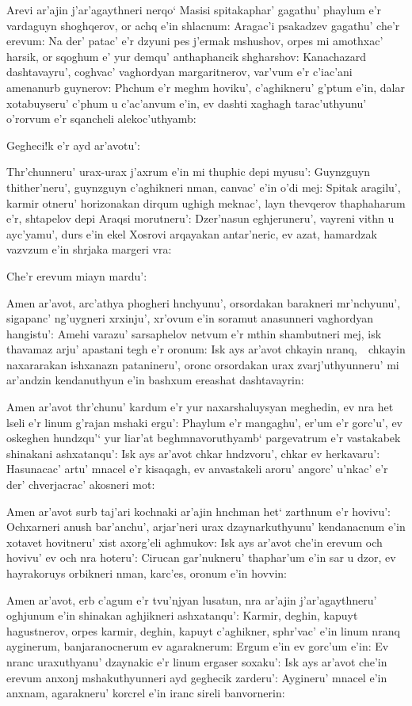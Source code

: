Arevi ar'ajin j'ar'agaythneri nerqo` Masisi spitakaphar' gagathu' phaylum e'r
vardaguyn shoghqerov, or achq e'in shlacnum: Aragac'i psakadzev gagathu' che'r
erevum: Na der' patac' e'r dzyuni pes j'ermak mshushov, orpes mi amothxac'
harsik, or sqoghum e' yur demqu' anthaphancik shgharshov: Kanachazard
dashtavayru', coghvac' vaghordyan margaritnerov, var'vum e'r c'iac'ani
amenanurb guynerov: Phchum e'r meghm hoviku', c'aghikneru' g'ptum e'in, dalar
xotabuyseru' c'phum u c'ac'anvum e'in, ev dashti xaghagh tarac'uthyunu'
o'rorvum e'r sqancheli alekoc'uthyamb:

Gegheci!k e'r ayd ar'avotu':

Thr'chunneru' urax-urax j'axrum e'in mi thuphic depi myusu': Guynzguyn
thi\-ther'\-neru', guynzguyn c'aghikneri nman, canvac' e'in o'di mej: Spitak
aragilu', karmir otneru' horizonakan dirqum ughigh meknac', layn thevqerov
thaphaharum e'r, shtapelov depi Araqsi morutneru': Dzer'nasun eghjeruneru',
vayreni vithn u ayc'yamu', durs e'in ekel Xosrovi arqayakan antar'neric, ev
azat, hamardzak vazvzum e'in shrjaka margeri vra:

Che'r erevum miayn mardu':

Amen ar'avot, arc'athya phogheri hnchyunu', orsordakan barakneri mr'nchyunu',
si\-ga\-panc' ng'uygneri xrxinju', xr'ovum e'in soramut anasunneri vaghordyan
hangistu': Amehi varazu' sarsaphelov netvum e'r mthin shambutneri mej, isk
thavamaz arju' apastani tegh e'r oronum: Isk ays ar'avot chkayin
nranq,~\armemdash~chkayin naxararakan ishxanazn patanineru', oronc orsordakan
urax zvarj'uthyunneru' mi ar'andzin ken\-da\-nu\-thyun e'in bashxum ereashat
dashtavayrin:

Amen ar'avot thr'chunu' kardum e'r yur naxarshaluysyan meghedin, ev nra het
lseli e'r linum g'rajan mshaki ergu': Phaylum e'r mangaghu', er'um e'r
gorc'u', ev oskeghen hundzqu'` yur liar'at beghmnavoruthyamb` pargevatrum e'r
vastakabek shinakani ashxatanqu': Isk ays ar'avot chkar hndzvoru', chkar ev
herkavaru': Hasunacac' artu' mnacel e'r kisaqagh, ev anvastakeli aroru'
angorc' u'nkac' e'r der' chverjacrac' akosneri mot:

Amen ar'avot surb taj'ari kochnaki ar'ajin hnchman het` zarthnum e'r hovivu':
Ochxarneri anush bar'anchu', arjar'neri urax dzaynarkuthyunu' kendanacnum e'in
xo\-ta\-vet hovitneru' xist axorg'eli aghmukov: Isk ays ar'avot che'in erevum
och hovivu' ev och nra hoteru': Cirucan gar'nukneru' thaphar'um e'in sar u
dzor, ev hayrakoruys orbikneri nman, karc'es, oronum e'in hovvin:

Amen ar'avot, erb c'agum e'r tvu'njyan lusatun, nra ar'ajin j'ar'agaythneru'
oghjunum e'in shinakan aghjikneri ashxatanqu': Karmir, deghin, kapuyt
hagustnerov, orpes karmir, deghin, kapuyt c'aghikner, sphr'vac' e'in linum
nranq ayginerum, ban\-ja\-ra\-noc\-ne\-rum ev agaraknerum: Ergum e'in ev
gorc'um e'in: Ev nranc uraxuthyanu' dzaynakic e'r linum ergaser soxaku': Isk
ays ar'avot che'in erevum anxonj msha\-ku\-thyun\-ne\-ri ayd geghecik
zarderu': Aygineru' mnacel e'in anxnam, agarakneru' korcrel e'in iranc sireli
banvornerin:

